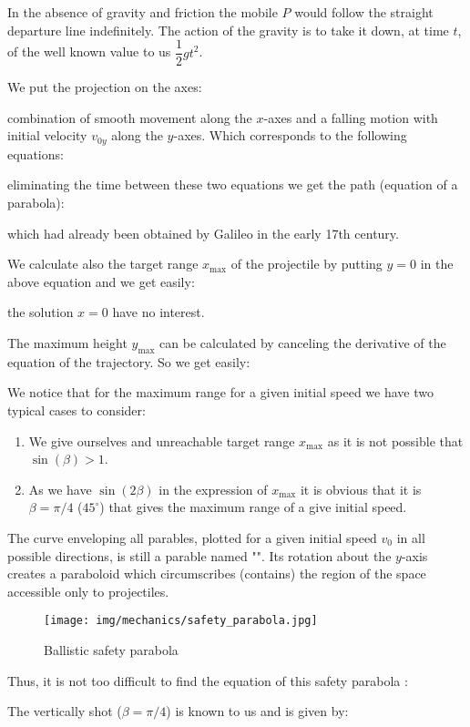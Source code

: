 	In the absence of gravity and friction the mobile $P$ would follow the straight departure line indefinitely. The action of the gravity is to take it down, at time $t$, of the well known value to us $\dfrac{1}{2}gt^2$.

	We put the projection on the axes:
	
	combination of smooth movement along the $x$-axes and a falling motion with initial velocity $v_{0y}$ along the $y$-axes. Which corresponds to the following equations:
		
	eliminating the time between these two equations we get the path (equation of a parabola):
		
	which had already been obtained by Galileo in the early 17th century.

	We calculate also the target range $x_{\max}$ of the projectile by putting $y=0$ in the above equation and we get easily:
		
	the solution $x=0$ have no interest.

	The maximum height $y_{\max}$ can be calculated by canceling the derivative of the equation of the trajectory. So we get easily:
	
	We notice that for the maximum range for a given initial speed we have two typical cases to consider:
	\begin{enumerate}
		\item We give ourselves and unreachable target range $x_{\max}$ as it is not possible that $\sin(\beta)>1$.

		\item As we have $\sin(2\beta)$ in the expression of $x_{\max}$ it is obvious that it is $\beta=\pi/4$ ($45^\circ$) that gives the maximum range of a give initial speed.
	\end{enumerate}
	The curve enveloping all parables, plotted for a given initial speed $v_0$ in all possible directions, is still a parable named "". Its rotation about the $y$-axis creates a paraboloid which circumscribes (contains) the region of the space accessible only to projectiles.
	\begin{figure}[H]
		\centering
		\texttt{[image: img/mechanics/safety\_parabola.jpg]}
		\caption[]{Ballistic safety parabola}
	\end{figure}
	Thus, it is not too difficult to find the equation of this safety parabola :

	The vertically shot ($\beta=\pi/4$) is known to us and is given by:
	
